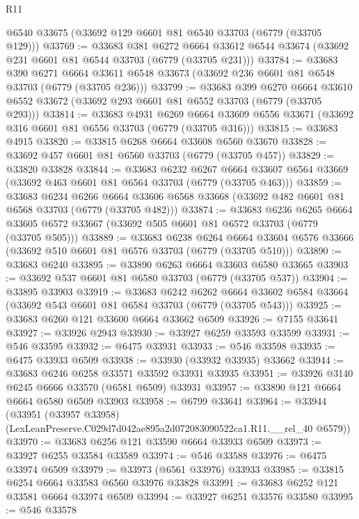 \begin{lexlean}{R11}
\begin{coremodule}
    @6540
    @33675
    (@33692 @129 @6601 @81 @6540 @33703 (@6779 (@33705 @129)))
@33769 := @33683
    @381
    @6272
    @6664
    @33612
    @6544
    @33674
    (@33692 @231 @6601 @81 @6544 @33703 (@6779 (@33705 @231)))
@33784 := @33683
    @390
    @6271
    @6664
    @33611
    @6548
    @33673
    (@33692 @236 @6601 @81 @6548 @33703 (@6779 (@33705 @236)))
@33799 := @33683
    @399
    @6270
    @6664
    @33610
    @6552
    @33672
    (@33692 @293 @6601 @81 @6552 @33703 (@6779 (@33705 @293)))
@33814 := @33683
    @4931
    @6269
    @6664
    @33609
    @6556
    @33671
    (@33692 @316 @6601 @81 @6556 @33703 (@6779 (@33705 @316)))
@33815 := @33683 @4915
@33820 := @33815 @6268 @6664 @33608 @6560 @33670
@33828 := @33692 @457 @6601 @81 @6560 @33703 (@6779 (@33705 @457))
@33829 := @33820 @33828
@33844 := @33683
    @6232
    @6267
    @6664
    @33607
    @6564
    @33669
    (@33692 @463 @6601 @81 @6564 @33703 (@6779 (@33705 @463)))
@33859 := @33683
    @6234
    @6266
    @6664
    @33606
    @6568
    @33668
    (@33692 @482 @6601 @81 @6568 @33703 (@6779 (@33705 @482)))
@33874 := @33683
    @6236
    @6265
    @6664
    @33605
    @6572
    @33667
    (@33692 @505 @6601 @81 @6572 @33703 (@6779 (@33705 @505)))
@33889 := @33683
    @6238
    @6264
    @6664
    @33604
    @6576
    @33666
    (@33692 @510 @6601 @81 @6576 @33703 (@6779 (@33705 @510)))
@33890 := @33683 @6240
@33895 := @33890 @6263 @6664 @33603 @6580 @33665
@33903 := @33692 @537 @6601 @81 @6580 @33703 (@6779 (@33705 @537))
@33904 := @33895 @33903
@33919 := @33683
    @6242
    @6262
    @6664
    @33602
    @6584
    @33664
    (@33692 @543 @6601 @81 @6584 @33703 (@6779 (@33705 @543)))
@33925 := @33683 @6260 @121 @33600 @6664 @33662 @6509
@33926 := @7155 @33641
@33927 := @33926 @2943
@33930 := @33927 @6259 @33593 @33599
@33931 := @546 @33595
@33932 := @6475 @33931
@33933 := @546 @33598
@33935 := @6475 @33933 @6509
@33938 := @33930 (@33932 @33935) @33662
@33944 := @33683 @6246 @6258 @33571 @33592 @33931 @33935
@33951 := @33926 @3140 @6245 @6666 @33570 (@6581 @6509) @33931
@33957 := @33890 @121 @6664 @6664 @6580 @6509 @33903
@33958 := @6799 @33641
@33964 := @33944
    (@33951 (@33957 @33958) (LexLeanPreserve.C029d7d042ae895a2d072083090522ca1.R11.__rel_40 @6579))
@33970 := @33683 @6256 @121 @33590 @6664 @33933 @6509
@33973 := @33927 @6255 @33584 @33589
@33974 := @546 @33588
@33976 := @6475 @33974 @6509
@33979 := @33973 (@6561 @33976) @33933
@33985 := @33815 @6254 @6664 @33583 @6560 @33976 @33828
@33991 := @33683 @6252 @121 @33581 @6664 @33974 @6509
@33994 := @33927 @6251 @33576 @33580
@33995 := @546 @33578

\end{coremodule}
\end{lexlean}
